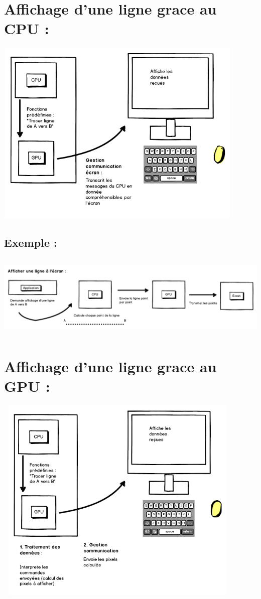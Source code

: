 


\section{Affichage d'une ligne grace au CPU :}
\includegraphics[width=12cm,height=9cm]{img/cpuRaster.png} \\

\subsection{Exemple :}
\begin{center}
\includegraphics[width=15cm,height=4cm]{img/cpuRasterExemple.png}
\end{center}


\section{Affichage d'une ligne grace au GPU :}
\includegraphics[width=12cm,height=10cm]{img/gpuRaster.png} \\


